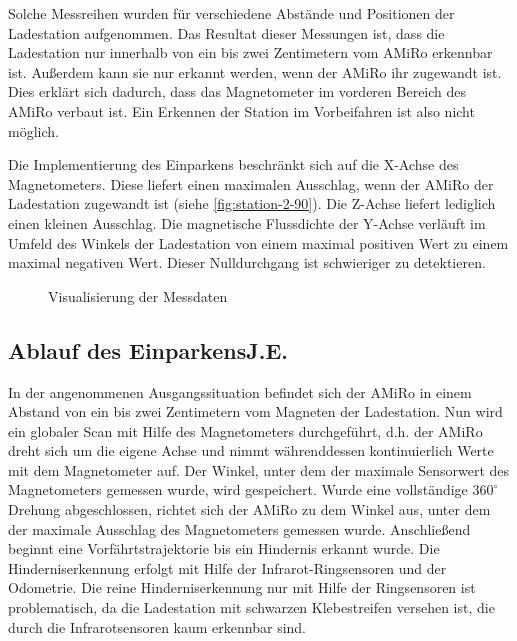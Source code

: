 Solche Messreihen wurden für verschiedene Abstände und Positionen der Ladestation aufgenommen. Das Resultat dieser Messungen ist, dass die Ladestation nur innerhalb von ein bis zwei Zentimetern vom AMiRo erkennbar ist. Außerdem kann sie nur erkannt werden, wenn der AMiRo ihr zugewandt ist. Dies erklärt sich dadurch, dass das Magnetometer im vorderen Bereich des AMiRo verbaut ist. Ein Erkennen der Station im Vorbeifahren ist also nicht möglich.

Die Implementierung des Einparkens beschränkt sich auf die X-Achse des Magnetometers. Diese liefert einen maximalen Ausschlag, wenn der AMiRo der Ladestation zugewandt ist (siehe \ref{fig:station-2-90}). Die Z-Achse liefert lediglich einen kleinen Ausschlag. Die magnetische Flussdichte der Y-Achse verläuft im Umfeld des Winkels der Ladestation von einem maximal positiven Wert zu einem maximal negativen Wert. Dieser Nulldurchgang ist schwieriger zu detektieren.


\begin{figure}
	\caption{Visualisierung der Messdaten}
	\label{fig:messdaten}
\end{figure}

\subsection[Ablauf des Einparkens]{Ablauf des Einparkens\hfill {\normalsize J.E.}}
In der angenommenen Ausgangssituation befindet sich der AMiRo in einem Abstand von ein bis zwei Zentimetern vom Magneten der Ladestation. Nun wird ein globaler Scan mit Hilfe des Magnetometers durchgeführt, d.h. der AMiRo dreht sich um die eigene Achse und nimmt währenddessen kontinuierlich Werte mit dem Magnetometer auf. Der Winkel, unter dem der maximale Sensorwert des Magnetometers gemessen wurde, wird gespeichert. Wurde eine vollständige $360^\circ$ Drehung abgeschlossen, richtet sich der AMiRo zu dem Winkel aus, unter dem der maximale Ausschlag des Magnetometers gemessen wurde. Anschließend beginnt eine Vorfährtstrajektorie bis ein Hindernis erkannt wurde. Die Hinderniserkennung erfolgt mit Hilfe der Infrarot-Ringsensoren und der Odometrie. Die reine Hinderniserkennung nur mit Hilfe der Ringsensoren ist problematisch, da die Ladestation mit schwarzen Klebestreifen versehen ist, die durch die Infrarotsensoren kaum erkennbar sind.

